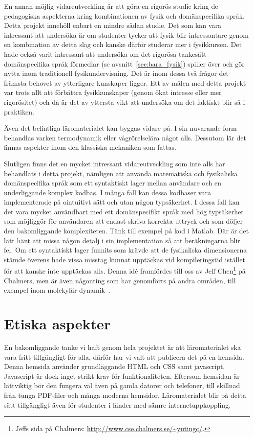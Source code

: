 En annan möjlig vidareutveckling är att göra en rigorös studie kring de
pedagogiska aspekterna kring kombinationen av fysik och domänspecifika språk.
Detta projekt innehöll enbart en mindre sådan studie. Det som kan vara
intressant att undersöka är om studenter tycker att fysik blir intressantare
genom en kombination av detta slag och kanske därför studerar mer i fysikkursen.
Det hade också varit intressant att undersöka om det rigorösa tankesätt
domänspecifika språk förmedlar (se avsnitt~\ref{sec:bara_fysik}) spiller över och
gör nytta inom traditionell fysikundervisning. Det är inom dessa två frågor det
främsta behovet av ytterligare kunskaper ligger. Ett av målen med detta projekt var trots allt att förbättra fysikkunskaper (genom ökat intresse eller mer
rigorösitet) och då är det av yttersta vikt att undersöka om det faktiskt blir
så i praktiken.

Även det befintliga läromaterialet kan byggas vidare på. I sin nuvarande
form behandlas varken termodynamik eller vågrörelselära något alls. Dessutom lär
det finnas aspekter inom den klassiska mekaniken som fattas.

Slutligen finns det en mycket intressant vidareutveckling som inte alls har
behandlats i detta projekt, nämligen att använda matematiska och fysikaliska domänspecifika språk som
ett syntaktiskt lager mellan användare och en underliggande komplex kodbas. I
många fall kan dessa kodbaser vara implementerade på ointuitivt sätt och utan
någon typsäkerhet. I dessa fall kan det vara mycket användbart med ett
domänspecifikt språk med hög typsäkerhet som möjliggör för användaren att
endast skriva korrekta uttryck och som döljer den bakomliggande komplexiteten. Tänk till exempel på kod i Matlab. Där är det lätt hänt att missa någon detalj i sin implementation så att beräkningarna blir fel. Om ett syntaktiskt lager funnits som krävde att de fysikaliska dimensionerna stämde överens hade vissa misstag kunnat upptäckas vid kompileringstid istället för att kanske inte upptäckas alls. Denna idé framfördes till oss av Jeff Chen\footnote{Jeffs sida på Chalmers:
\url{http://www.cse.chalmers.se/\~yutingc/}.}
på Chalmers, men är även någonting som har genomförts på andra områden, till
exempel inom molekylär dynamik~\cite{MD}.

\section{Etiska aspekter}

En bakomliggande tanke vi haft genom hela projektet är att läromaterialet ska
vara fritt tillgängligt för alla, därför har vi valt att publicera det på en
hemsida.  Denna hemsida använder grundläggande HTML och CSS samt javascript.
Javascript är dock inget strikt krav för funktionaliteten. Eftersom hemsidan är
lättviktig bör den fungera väl även på gamla datorer och telefoner, till
skillnad från tunga PDF-filer och många moderna hemsidor. Läromaterialet blir på
detta sätt tillgängligt även för studenter i länder med sämre
internetuppkoppling.

